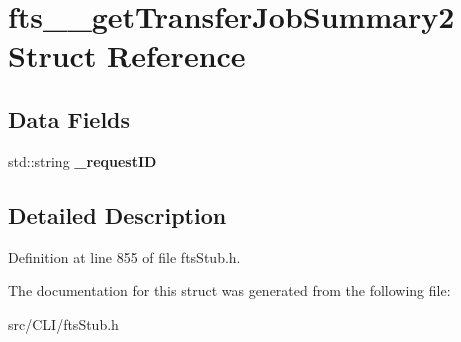 \section{fts\_\-\_\-getTransferJobSummary2 Struct Reference}
\label{structfts____getTransferJobSummary2}
\subsection*{Data Fields}
\begin{DoxyCompactItemize}
\item 
std::string {\bfseries \_\-requestID}\label{structfts____getTransferJobSummary2_a9655ba44438b7a55202473865fb6a296}

\end{DoxyCompactItemize}


\subsection{Detailed Description}


Definition at line 855 of file ftsStub.h.



The documentation for this struct was generated from the following file:\begin{DoxyCompactItemize}
\item 
src/CLI/ftsStub.h\end{DoxyCompactItemize}
